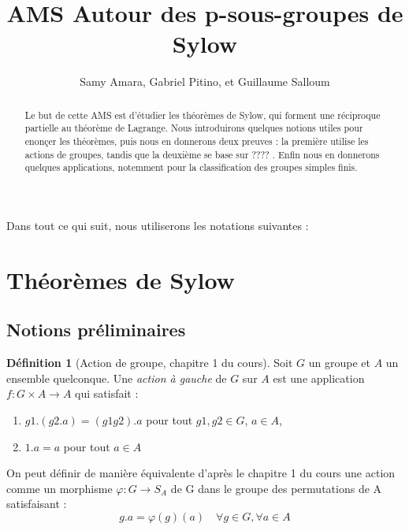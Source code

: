 \documentclass{article}
\title{AMS Autour des p-sous-groupes de Sylow}
\author{Samy Amara, Gabriel Pitino, et Guillaume Salloum}
\date{}
\theoremstyle{definition}
\newtheorem{definition}[subsubsection]{Définition}
\theoremstyle{plain}
\theoremstyle{plain}
\theoremstyle{plain}
\theoremstyle{plain}
\theoremstyle{plain}
\theoremstyle{definition}
\theoremstyle{plain}
\theoremstyle{plain}
\begin{document}
\maketitle

\begin{abstract}
	Le but de cette AMS est d'étudier les théorèmes de Sylow, qui forment une réciproque partielle au théorème de Lagrange.
	Nous introduirons quelques notions utiles pour enonçer les théorèmes, puis nous en donnerons deux preuves : la première utilise les actions de groupes, tandis que la deuxième se base sur ????  .
	Enfin nous en donnerons quelques applications, notemment pour la classification des groupes simples finis.%
\end{abstract}



\tableofcontents
\clearpage

Dans tout ce qui suit, nous utiliserons les notations suivantes :
\glsaddall
\renewcommand*{\arraystretch}{1.2} %
\printnoidxglossary[title=Notations,type=symbols,style=long,sort=standard,nonumberlist]

\clearpage


\section{Théorèmes de Sylow}
\subsection{Notions préliminaires}


\begin{definition}[Action de groupe, chapitre 1 du cours]
	Soit \( G \) un groupe et \( A \) un ensemble quelconque. Une \textit{action à gauche} de \( G \) sur \( A \) est une application \( f : G \times A \rightarrow A\) qui satisfait :
	\begin{enumerate}[label = (\roman*)]
		\item \(g1.(g2.a) = (g1g2).a \) pour tout \(g1,g2 \in G\), \(a \in A\),
		\item \(1.a = a\) pour tout \(a \in A\)
	\end{enumerate}

	On peut définir de manière équivalente d'après le chapitre 1 du cours une action comme un morphisme \( \varphi : G \rightarrow S_{A} \) de G dans le groupe des permutations de A satisfaisant :
	\begin{equation}
		g.a = \varphi(g)(a) \quad \forall g \in G, \forall a \in A
	\end{equation}
\end{definition}
\end{document}
